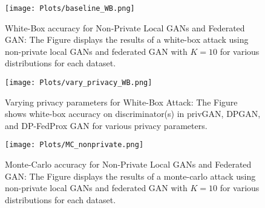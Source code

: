










\begin{figure}
 \centering
 \texttt{[image: Plots/baseline\_WB.png]}
 \caption{White-Box accuracy for Non-Private Local GANs and Federated GAN: The Figure displays the results of a white-box attack using non-private local GANs and federated GAN with $K=10$ for various distributions for each dataset.}
 \label{fig:baseline_WB}
\end{figure}


\begin{figure}
 \centering

  \texttt{[image: Plots/vary\_privacy\_WB.png]}

 \caption{Varying privacy parameters for White-Box Attack: The Figure shows white-box accuracy on discriminator(s) in privGAN, DPGAN, and DP-FedProx GAN for various privacy parameters.}
 \label{fig:vary_privacy_WB}
\end{figure}



\begin{figure}
 \centering
 \texttt{[image: Plots/MC\_nonprivate.png]}
 \caption{Monte-Carlo accuracy for Non-Private Local GANs and Federated GAN: The Figure displays the results of a monte-carlo attack using non-private local GANs and federated GAN with $K=10$ for various distributions for each dataset.}
 \label{fig:MC_nonprivate}
\end{figure}

